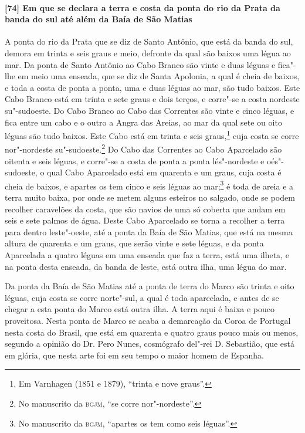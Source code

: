 \begin{linenumbers}
\paragraph{[74] Em que se declara a terra e costa da ponta do rio da Prata da banda do sul
até além da Baía de São Matias} \quad
A ponta do rio da Prata que se diz de Santo Antônio, que está da banda do sul, demora em
trinta e seis graus e meio, defronte da qual são baixos uma légua ao mar. Da ponta de
Santo Antônio ao Cabo Branco são vinte e duas léguas e fica"-lhe em meio uma enseada, que
se diz de Santa Apolonia, a qual é cheia de baixos, e toda a costa de ponta a ponta, uma e
duas léguas ao mar, são tudo baixos. Este Cabo Branco está em trinta e sete graus e dois
terços, e corre"-se a costa nordeste su"-sudoeste. Do Cabo Branco ao Cabo das Correntes são
vinte e cinco léguas, e fica entre um cabo e o outro a Angra das Areias, ao mar da qual
sete ou oito léguas são tudo baixos. Este Cabo está em trinta e seis graus,\footnote{ Em
Varnhagen (1851 e 1879), ``trinta e nove graus''.} cuja costa se corre nor"-nordeste
su"-sudoeste.\footnote{ No manuscrito da \textsc{bgjm}, ``se corre nor"-nordeste''.} Do
Cabo das Correntes ao Cabo Aparcelado são oitenta e seis léguas, e corre"-se a costa de
ponta a ponta lés"-nordeste e oés"-sudoeste, o qual Cabo Aparcelado está em quarenta e um
graus, cuja costa é cheia de baixos, e apartes os tem cinco e seis léguas ao
mar;\footnote{ No manuscrito da \textsc{bgjm}, ``apartes os tem como seis léguas''.} é
toda de areia e a terra muito baixa, por onde se metem alguns esteiros no salgado, onde se
podem recolher caravelões da costa, que são navios de uma só coberta que andam em seis e
sete palmos de água. Deste Cabo Aparcelado se torna a recolher a terra para dentro
leste"-oeste, até a ponta da Baía de São Matias, que está na mesma altura de quarenta e um
graus, que serão vinte e sete léguas, e da ponta Aparcelada a quatro léguas em uma enseada
que faz a terra, está uma ilheta, e na ponta desta enseada, da banda de leste, está outra
ilha, uma légua do mar.

Da ponta da Baía de São Matias até a ponta de terra do Marco são trinta e oito léguas,
cuja costa se corre norte"-sul, a qual é toda aparcelada, e antes de se chegar a esta ponta
do Marco está outra ilha. A terra aqui é baixa e pouco proveitosa. Nesta ponta de Marco se
acaba a demarcação da Coroa de Portugal nesta costa do Brasil, que está em quarenta e
quatro graus pouco mais ou menos, segundo a opinião do Dr. Pero Nunes, cosmógrafo del"-rei
D. Sebastião, que está em glória, que nesta arte foi em seu tempo o maior homem de
Espanha.

\end{linenumbers}

